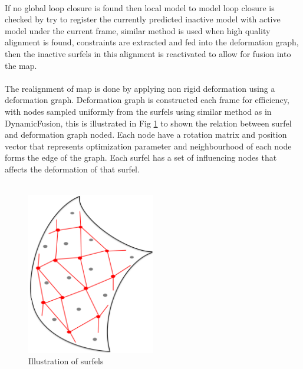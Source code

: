\documentclass[12pt,twoside]{article}
\begin{document}
\\
If no global loop closure is found then local model to model loop closure is checked by try to register the currently predicted inactive model with active model under the current frame, similar method is used when high quality alignment is found, constraints are extracted and fed into  the deformation graph, then the inactive surfels in this alignment is reactivated to allow for fusion into the map.\\
\\
The realignment of map is done by applying non rigid deformation using a deformation graph. Deformation graph  is constructed each frame for efficiency, with nodes sampled uniformly from the surfels using similar method as in DynamicFusion\citep{newcombe2015dynamicfusion}, this is illustrated in Fig \ref{fig:surfel1} to shown the relation between surfel and deformation graph noded. Each node have a rotation matrix and position vector that represents optimization parameter and neighbourhood of each node forms the edge of the graph. Each surfel has a set of influencing nodes that affects the deformation of that surfel.\\
\\
\begin{figure}[h]
    \centering
    \includegraphics[width=0.5\textwidth]{figures/surfel1}
    \caption{Illustration of surfels}
    \label{fig:surfel1}
\end{figure}
\end{document}
